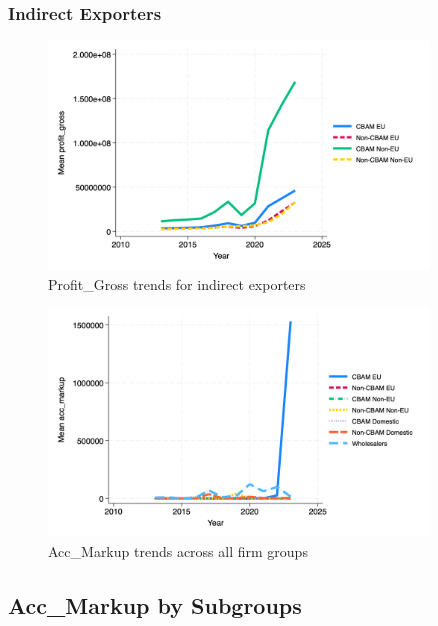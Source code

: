\documentclass{article}
\begin{document}
\subsubsection{Indirect Exporters}
\begin{figure}[h!]
\centering
\includegraphics[width=0.9\textwidth]{profit_gross_indir.png}
\caption{Profit_Gross trends for indirect exporters}
\label{fig:profit_gross_indir}
\end{figure}

\begin{figure}[h!]
\centering
\includegraphics[width=0.9\textwidth]{acc_markup_main_groups.png}
\caption{Acc_Markup trends across all firm groups}
\label{fig:acc_markup_main}
\end{figure}

\subsection{Acc_Markup by Subgroups}
\end{document}
